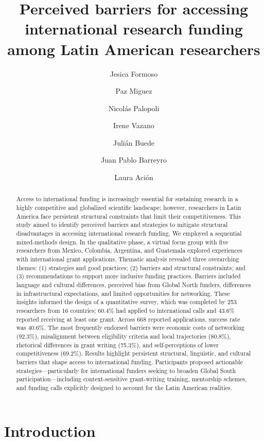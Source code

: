 \documentclass[
  letterpaper,
  DIV=11,
  numbers=noendperiod]{scrartcl}
\title{Perceived barriers for accessing international research funding
among Latin American researchers}
\author{Jesica Formoso \and Paz Miguez \and Nicolás Palopoli \and Irene
Vazano \and Julián Buede \and Juan Pablo Barreyro \and Laura Ación}
\date{}
\begin{document}
\maketitle
\begin{abstract}
Access to international funding is increasingly essential for sustaining
research in a highly competitive and globalized scientific landscape;
however, researchers in Latin America face persistent structural
constraints that limit their competitiveness. This study aimed to
identify perceived barriers and strategies to mitigate structural
disadvantages in accessing international research funding. We employed a
sequential mixed-methods design. In the qualitative phase, a virtual
focus group with five researchers from Mexico, Colombia, Argentina, and
Guatemala explored experiences with international grant applications.
Thematic analysis revealed three overarching themes: (1) strategies and
good practices; (2) barriers and structural constraints; and (3)
recommendations to support more inclusive funding practices. Barriers
included language and cultural differences, perceived bias from Global
North funders, differences in infrastructural expectations, and limited
opportunities for networking. These insights informed the design of a
quantitative survey, which was completed by 253 researchers from 16
countries; 60.4\% had applied to international calls and 43.6\% reported
receiving at least one grant. Across 668 reported applications, success
rate was 40.6\%. The most frequently endorsed barriers were economic
costs of networking (92.3\%), misalignment between eligibility criteria
and local trajectories (80.8\%), rhetorical differences in grant writing
(75.3\%), and self-perceptions of lower competitiveness (69.2\%).
Results highlight persistent structural, linguistic, and cultural
barriers that shape access to international funding. Participants
proposed actionable strategies---particularly for international funders
seeking to broaden Global South participation---including
context-sensitive grant-writing training, mentorship schemes, and
funding calls explicitly designed to account for the Latin American
realities.
\end{abstract}


\section{Introduction}\label{introduction}
\end{document}
